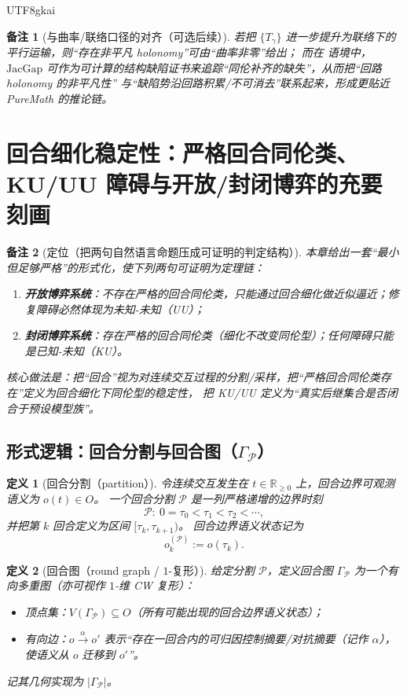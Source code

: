 \documentclass[12pt]{article}
\newtheorem{definition}{定义}[section]
\newtheorem{remark}{备注}[section]
\newcommand{\RR}{\mathbb{R}}
\newcommand{\GFramework}{\text{G-Framework}}
\newcommand{\JacGap}{\ensuremath{\mathrm{JacGap}}} %
\begin{document}
\begin{CJK*}{UTF8}{gkai}
\begin{remark}[与曲率/联络口径的对齐（可选后续）]
若把 $\{T_{\gamma}\}$ 进一步提升为联络下的平行运输，则“存在非平凡 holonomy”可由“曲率非零”给出；
而在 \GFramework{} 语境中，$\JacGap$ 可作为可计算的结构缺陷证书来追踪“同伦补齐的缺失”，从而把“回路 holonomy 的非平凡性”
与“缺陷势沿回路积累/不可消去”联系起来，形成更贴近 PureMath 的推论链。
\end{remark}

\section{回合细化稳定性：严格回合同伦类、KU/UU 障碍与开放/封闭博弈的充要刻画}
\label{sec:round-refinement-stability-ku-uu}

\begin{remark}[定位（把两句自然语言命题压成可证明的判定结构）]
本章给出一套“最小但足够严格”的形式化，使下列两句可证明为定理链：
\begin{enumerate}
  \item \textbf{开放博弈系统}：不存在严格的回合同伦类，只能通过回合细化做近似逼近；修复障碍必然体现为未知-未知（UU）；
  \item \textbf{封闭博弈系统}：存在严格的回合同伦类（细化不改变同伦型）；任何障碍只能是已知-未知（KU）。
\end{enumerate}
核心做法是：把“回合”视为对连续交互过程的分割/采样，把“严格回合同伦类存在”定义为回合细化下同伦型的稳定性，
把 KU/UU 定义为“真实后继集合是否闭合于预设模型族”。
\end{remark}

\subsection{形式逻辑：回合分割与回合图（$\Gamma_{\mathcal{P}}$）}
\label{sec:round-refinement-def-round}

\begin{definition}[回合分割（partition）]
\label{def:round-partition}
令连续交互发生在 $t\in\RR_{\ge 0}$ 上，回合边界可观测语义为 $o(t)\in O$。
一个回合分割 $\mathcal{P}$ 是一列严格递增的边界时刻
\[
  \mathcal{P}:\ 0=\tau_0<\tau_1<\tau_2<\cdots,
\]
并把第 $k$ 回合定义为区间 $[\tau_k,\tau_{k+1})$。
回合边界语义状态记为
\[
  o^{(\mathcal{P})}_k:=o(\tau_k).
\]
\end{definition}

\begin{definition}[回合图（round graph / $1$-复形）]
\label{def:round-graph-by-partition}
给定分割 $\mathcal{P}$，定义回合图 $\Gamma_{\mathcal{P}}$ 为一个有向多重图（亦可视作 $1$-维 CW 复形）：
\begin{itemize}
  \item 顶点集：$V(\Gamma_{\mathcal{P}})\subseteq O$（所有可能出现的回合边界语义状态）；
  \item 有向边：$o\xrightarrow{\alpha}o'$ 表示“存在一回合内的可归因控制摘要/对抗摘要（记作 $\alpha$），使语义从 $o$ 迁移到 $o'$”。
\end{itemize}
记其几何实现为 $|\Gamma_{\mathcal{P}}|$。
\end{definition}


\end{CJK*}
\end{document}
